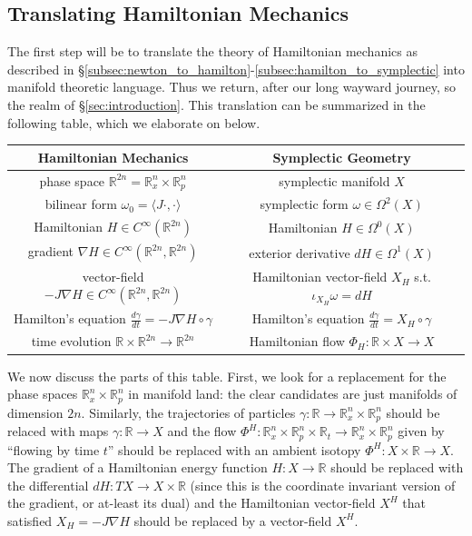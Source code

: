 \documentclass[12pt]{article}
\theoremstyle{definition}
\numberwithin{equation}{section}
\newcommand{\R}{{\mathbb R}}
\begin{document}
\subsection{Translating Hamiltonian Mechanics} \label{subsec:translating_mechanics} The first step will be to translate the theory of Hamiltonian mechanics as described in \S \ref{subsec:newton_to_hamilton}-\ref{subsec:hamilton_to_symplectic} into manifold theoretic language. Thus we return, after our long wayward journey, so the realm of \S \ref{sec:introduction}. This translation can be summarized in the following table, which we elaborate on below.

\begin{center}
\begin{tabular}{|c|c|}
\hline
Hamiltonian Mechanics & Symplectic Geometry\\
\hline 
\hline
phase space $\R^{2n} = \R^n_x \times \R^n_p$ & symplectic manifold $X$\\
\hline
bilinear form $\omega_0 = \langle J \cdot,\cdot\rangle$ & symplectic form $\omega \in \Omega^2(X)$\\
\hline
Hamiltonian $H \in C^\infty(\R^{2n})$ & Hamiltonian $H \in \Omega^0(X)$\\
\hline
gradient $\nabla H \in C^\infty(\R^{2n},\R^{2n})$ & exterior derivative $dH \in \Omega^1(X)$\\
\hline
vector-field $-J\nabla H \in C^\infty(\R^{2n},\R^{2n})$ & Hamiltonian vector-field $X_H$ s.t. $\iota_{X_H}\omega = dH$\\
\hline
Hamilton's equation $\frac{d\gamma}{dt} = -J\nabla H \circ \gamma$ & Hamilton's equation $\frac{d\gamma}{dt} = X_H \circ \gamma$\\
\hline
time evolution $\R \times \R^{2n} \to \R^{2n}$ & Hamiltonian flow $\Phi_H:\R \times X \to X$\\
\hline
\end{tabular}
\end{center}

We now discuss the parts of this table. First, we look for a replacement for the phase spaces $\R^n_x \times \R^n_p$ in manifold land: the clear candidates are just manifolds of dimension $2n$. Similarly, the trajectories of particles $\gamma:\R \to \R^n_x \times \R^n_p$ should be relaced with maps $\gamma:\R \to X$ and the flow $\Phi^H:\R^n_x \times \R^n_p \times \R_t \to \R^n_x \times \R^n_p$ given by ``flowing by time $t$'' should be replaced with an ambient isotopy $\Phi^H:X \times \R \to X$. The gradient of a Hamiltonian energy function $H:X \to \R$ should be replaced with the differential $dH:TX \to X \times \R$ (since this is the coordinate invariant version of the gradient, or at-least its dual) and the Hamiltonian vector-field $X^H$ that satisfied $X_H = -J\nabla H$ should be replaced by a vector-field $X^H$. 
\end{document}
